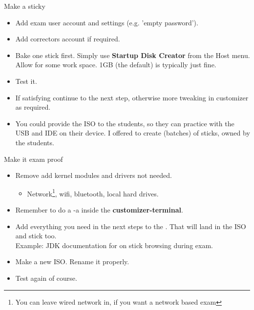 \begin{frame}{Make a sticky}
  \begin{itemize}
  \item Add exam user account and settings (e.g. 'empty password').
  \item Add correctors account if required.
  \item Bake one stick first. Simply use \textbf{Startup Disk Creator} from the
    Host menu. Allow for some work space. 1GB (the default) is
    typically just fine.
  \item Test it.
  \item If satisfying continue to the next step, otherwise more
    tweaking in customizer as required.
  \item You could provide the ISO to the students, so they can
    practice with the USB and IDE on their device. I offered to
    create (batches) of sticks, owned by the students.
  \end{itemize}
\end{frame}

\begin{frame}{Make it exam proof}
  \begin{itemize}
  \item Remove add kernel modules and drivers not needed.
    \begin{itemize}
    \item Network\footnote{You can leave wired network in, if you want
      a network based exam}, wifi, bluetooth, local hard drives.
    \end{itemize}
  \item Remember to do a  -a inside the
    \textbf{customizer-terminal}.
  \item Add everything you need in the next steps to the
    . That will land in the ISO and stick too.\\
    Example: JDK documentation for on stick browsing during exam.
  \item Make a new ISO. Rename it properly.
  \item Test again of course.
  \end{itemize}
\end{frame}

